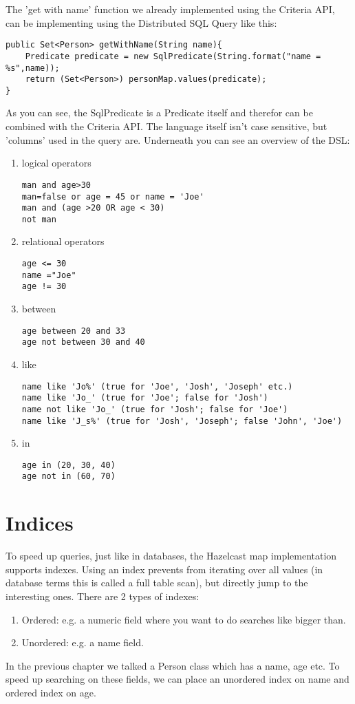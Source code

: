 The 'get with name' function we already implemented using the Criteria API, can be implementing using the Distributed SQL Query like this:
\begin{lstlisting}
public Set<Person> getWithName(String name){
    Predicate predicate = new SqlPredicate(String.format("name = %s",name));
    return (Set<Person>) personMap.values(predicate);
}
\end{lstlisting}
As you can see, the SqlPredicate is a Predicate itself and therefor can be combined with the Criteria API. The language itself isn't case sensitive, but 'columns' used in the query are. Underneath you can see an overview of the DSL:
\begin{enumerate}
	\item logical operators
	\begin{lstlisting}
man and age>30
man=false or age = 45 or name = 'Joe'
man and (age >20 OR age < 30)
not man
	\end{lstlisting}

	\item relational operators
	\begin{lstlisting}
age <= 30
name ="Joe"
age != 30
	\end{lstlisting}

	\item between
	\begin{lstlisting}
age between 20 and 33
age not between 30 and 40
	\end{lstlisting}

	\item like
	\begin{lstlisting}
name like 'Jo%' (true for 'Joe', 'Josh', 'Joseph' etc.)
name like 'Jo_' (true for 'Joe'; false for 'Josh')
name not like 'Jo_' (true for 'Josh'; false for 'Joe')
name like 'J_s%' (true for 'Josh', 'Joseph'; false 'John', 'Joe')
	\end{lstlisting}
	\item in
	\begin{lstlisting}
age in (20, 30, 40)
age not in (60, 70)
	\end{lstlisting}
\end{enumerate}

\section{Indices}
To speed up queries, just like in databases, the Hazelcast map implementation supports indexes. Using an index prevents from iterating over all values (in database terms this is called a full table scan), but directly jump to the interesting ones. There are 2 types of indexes:
\begin{enumerate}
\item Ordered: e.g. a numeric field where you want to do searches like bigger than.
\item Unordered: e.g. a name field.
\end{enumerate}
In the previous chapter we talked a Person class which has a name, age etc. To speed up searching on these fields, we can place an unordered index on name and ordered index on age. 

